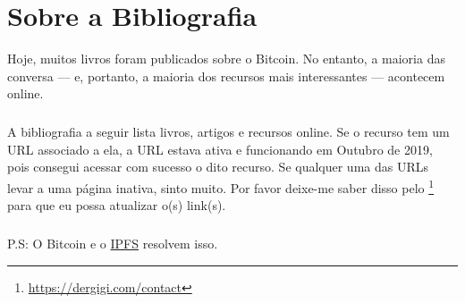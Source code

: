 \chapter*{Sobre a Bibliografia}

Hoje, muitos livros foram publicados sobre o Bitcoin. No entanto, a maioria das conversa --- e, portanto, a maioria dos recursos mais interessantes --- acontecem online.

\paragraph{}
A bibliografia a seguir lista livros, artigos e recursos online. Se o recurso tem um URL associado a ela, a URL estava ativa e funcionando em Outubro de 2019, pois consegui acessar com sucesso o dito recurso. Se qualquer uma das URLs levar a uma página inativa, sinto muito. Por favor deixe-me saber disso pelo \footnote{\url{https://dergigi.com/contact}} para que eu possa atualizar o(s) link(s).

\paragraph{}
P.S: O Bitcoin e o \href{https://ipfs.io/}{IPFS} resolvem isso.
